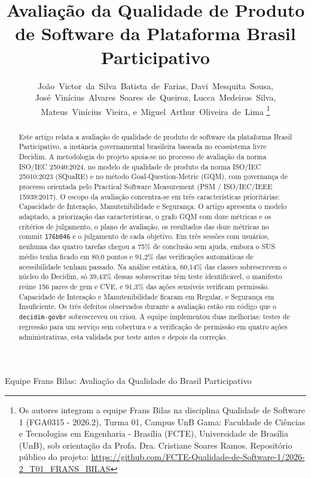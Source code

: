 \documentclass[journal]{IEEEtran}
\begin{document}
\title{Avaliação da Qualidade de Produto de Software da Plataforma Brasil Participativo}

\author{João~Victor~da~Silva~Batista~de~Farias,
        Davi~Mesquita~Sousa,
        José~Vinícius~Alvares~Soares~de~Queiroz,
        Lucca~Medeiros~Silva,
        Mateus~Vinícius~Vieira,
        e~Miguel~Arthur~Oliveira~de~Lima%
\thanks{Os autores integram a equipe Frans Bilas na disciplina Qualidade de Software 1 (FGA0315 - 2026.2), Turma 01, Campus UnB Gama: Faculdade de Ciências e Tecnologias em Engenharia - Brasília (FCTE), Universidade de Brasília (UnB), sob orientação da Profa. Dra. Cristiane Soares Ramos. Repositório público do projeto: \url{https://github.com/FCTE-Qualidade-de-Software-1/2026-2_T01_FRANS_BILAS}}%
}

%
{Equipe Frans Bilas: Avaliação da Qualidade do Brasil Participativo}

\maketitle

\begin{abstract}
Este artigo relata a avaliação de qualidade de produto de software da plataforma Brasil Participativo, a instância governamental brasileira baseada no ecossistema livre Decidim. A metodologia do projeto apoia-se no processo de avaliação da norma ISO/IEC 25040:2024, no modelo de qualidade de produto da norma ISO/IEC 25010:2023 (SQuaRE) e no método Goal-Question-Metric (GQM), com governança de processo orientada pelo Practical Software Measurement (PSM / ISO/IEC/IEEE 15939:2017). O escopo da avaliação concentra-se em três características prioritárias: Capacidade de Interação, Manutenibilidade e Segurança. O artigo apresenta o modelo adaptado, a priorização das características, o grafo GQM com doze métricas e os critérios de julgamento, o plano de avaliação, os resultados das doze métricas no commit \texttt{176b046} e o julgamento de cada objetivo. Em três sessões com usuários, nenhuma das quatro tarefas chegou a 75\% de conclusão sem ajuda, embora o SUS médio tenha ficado em 80,0 pontos e 91,2\% das verificações automáticas de acessibilidade tenham passado. Na análise estática, 60,14\% das classes sobrescrevem o núcleo do Decidim, só 39,43\% dessas sobrescritas têm teste identificável, o manifesto reúne 156 pares de gem e CVE, e 91,3\% das ações sensíveis verificam permissão. Capacidade de Interação e Manutenibilidade ficaram em Regular, e Segurança em Insuficiente. Os três defeitos observados durante a avaliação estão em código que o \texttt{decidim-govbr} sobrescreveu ou criou. A equipe implementou duas melhorias: testes de regressão para um serviço sem cobertura e a verificação de permissão em quatro ações administrativas, esta validada por teste antes e depois da correção.
\end{abstract}
\end{document}
